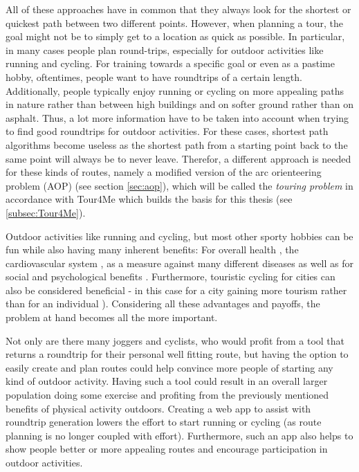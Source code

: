 All of these approaches have in common that they always look for the shortest or quickest path between two different points.
However, when planning a tour, the goal might not be to simply get to a location as quick as possible.
In particular, in many cases people plan round-trips, especially for outdoor activities like running and cycling.
For training towards a specific goal or even as a pastime hobby, oftentimes, people want to have roundtrips of a certain length. 
Additionally, people typically enjoy running or cycling on more appealing paths in nature rather than between high buildings and on softer ground rather than on asphalt.
Thus, a lot more information have to be taken into account when trying to find good roundtrips for outdoor activities. 
For these cases, shortest path algorithms become useless as the shortest path from a starting point back to the same point will always be to never leave. 
Therefor, a different approach is needed for these kinds of routes, namely a modified version of the arc orienteering problem (AOP) (see section \ref{sec:aop}), which will be called the \textit{touring problem} in accordance with Tour4Me \cite{buchin_tour4me_2022} which builds the basis for this thesis (see \ref{subsec:Tour4Me}). 


Outdoor activities like running and cycling, but most other sporty hobbies can be fun while also having many inherent benefits: For overall health \cite{oja_health_2011, ruegsegger_health_2018, vina_exercise_2012}, the cardiovascular system \cite{nystoriak_cardiovascular_2018}, as a measure against many different diseases \cite{oja_health_2011} as well as for social \cite{mueller_jogging_2007, obrien_jogging_2007, wankel_psychological_1990} and psychological benefits \cite{biddle_psychological_1993, cekin_psychological_2015, szabo_psychological_2013, wankel_psychological_1990}. Furthermore, touristic cycling for cities can also be considered beneficial - in this case for a city gaining more tourism rather than for an individual \cite{blondiau_economic_2016}).
Considering all these advantages and payoffs, the problem at hand becomes all the more important.

Not only are there many joggers and cyclists, who would profit from a tool that returns a roundtrip for their personal well fitting route, but having the option to easily create and plan routes could help convince more people of starting any kind of outdoor activity.
Having such a tool could result in an overall larger population doing some exercise and profiting from the previously mentioned benefits of physical activity outdoors. 
Creating a web app to assist with roundtrip generation lowers the effort to start running or cycling (as route planning is no longer coupled with effort).
Furthermore, such an app also helps to show people better or more appealing routes and encourage participation in outdoor activities.

